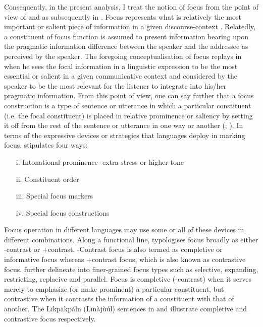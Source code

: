 \documentclass[output=paper,colorlinks,citecolor=brown]{langscibook}
\begin{document}
Consequently, in the present analysis, I treat the notion of focus from the point of view of \citet{Dik1981} and as subsequently in \citet{Dik1997}. Focus represents what is relatively the most important or salient piece of information in a given discourse-context \citep[42]{Dik1981}. Relatedly, a constituent of focus function is assumed to present information bearing upon the pragmatic information difference between the speaker and the addressee as perceived by the speaker. The foregoing conceptualisation of focus replays in \citet[326]{Dik1997} when he sees the focal information in a linguistic expression to be the most essential or salient in a given communicative context and considered by the speaker to be the most relevant for the listener to integrate into his/her pragmatic information. From this point of view, one can say further that a focus construction is a type of sentence or utterance in which a particular constituent (i.e. the focal constituent) is placed in relative prominence or saliency by setting it off from the rest of the sentence or utterance in one way or another (\citealt{Boadi1974, DrubigSchaffer2001}; \citealt[185]{MarfoBodomo2005}). In terms of the expressive devices or strategies that languages deploy in marking focus, \citet[43]{Dik1981} stipulates four ways:

\begin{itemize}
    \item[i.] Intonational prominence- extra stress or higher tone
    \item[ii.] Constituent order
    \item [iii.] Special focus markers
    \item [iv.] Special focus constructions
\end{itemize}

Focus operation in different languages may use some or all of these devices in different combinations. Along a functional line, \citet[60]{Dik1981} typologises focus broadly as either -contrast or +contrast. -Contrast focus is also termed as completive or informative focus whereas +contrast focus, which is also known as contrastive focus. \citet{Akrofi-Ansah2014, Schwarz2009, SkopeteasEtAl2006} further delineate into finer-grained focus types such as selective, expanding, restricting, replacive and parallel. Focus is completive (-contrast) when it serves merely to emphasize (or make prominent) a particular constituent, but contrastive when it contrasts the information of a constituent with that of another. The Līkpākpáln (Līnàjùúl) sentences in  and  illustrate completive and contrastive focus respectively.
\end{document}

